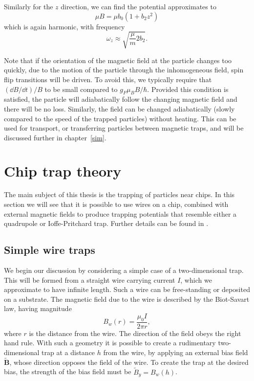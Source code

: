 Similarly for the $z$ direction, we can find the potential
approximates to
%
\begin{equation}
  \mu B = \mu b_0 (1 + b_2 z^2)
\end{equation}
%
which is again harmonic, with frequency
%
\begin{equation}
  \omega_z \approx \sqrt{\frac{\mu}{m}2b_2}.
\end{equation}

Note that if the orientation of the magnetic field at the particle changes too
quickly, due to the motion of the particle through the inhomogeneous field,
spin flip transitions will be driven. To avoid this, we typically require that
$(\dd B/\dd t)/B$ to be small compared to $g_F \mu_B B/\hbar$. Provided this
condition is satisfied, the particle will adiabatically follow the changing
magnetic field and there will be no loss.
%
Similarly, the field can be changed adiabatically (slowly compared to the speed
of the trapped particles) without heating. This can be used for
transport, or transferring particles between magnetic traps, and will be
discussed further in chapter~\ref{sim}.

\section{Chip trap theory}
\label{theory:chips}

The main subject of this thesis is the trapping of particles near chips. In
this section we will see that it is possible to use wires on a chip, combined
with external magnetic fields to produce trapping potentials that resemble
either a quadrupole or Ioffe-Pritchard trap. Further details can be found in
.

\subsection{Simple wire traps}
\label{theory:simple}

We begin our discussion by considering a simple case of a two-dimensional trap.
This will be formed from a straight wire carrying current $I$, which we
approximate to have infinite length. Such a wire can be free-standing or
deposited on a substrate. The magnetic field due to the wire is described by
the Biot-Savart law, having magnitude
%
\begin{equation}
  B_w(r) = \frac{\mu_0 I}{2 \pi r},
  \label{theory:eqn:wire}
\end{equation}
%
where $r$ is the distance from the wire. The direction of the field obeys the
right hand rule. With such a geometry it is possible to create a rudimentary
two-dimensional trap at a distance $h$ from the wire, by applying an external
bias field $\mathbf{\tilde{B}}$, whose direction opposes the field of the wire.
To create the trap at the desired bias, the strength of the bias field must be
$\tilde{B}_y = B_w(h)$.


